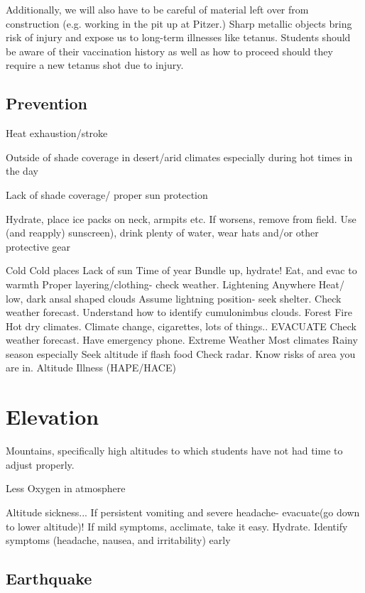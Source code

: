\documentclass[12pt]{../SOP2}
\begin{document}
\NP Additionally, we will also have to be careful of material left over from construction (e.g. working in the pit up at Pitzer.) Sharp metallic objects bring risk of injury and expose us to long-term illnesses like tetanus. Students should be aware of their vaccination history as well as how to proceed should they require a new tetanus shot due to injury.

\subsection{Prevention} 

\NP Heat exhaustion/stroke

\NP Outside of shade coverage in desert/arid climates especially during hot times in the day

\NP Lack of shade coverage/ proper sun protection

\NP Hydrate, place ice packs on neck, armpits etc. If worsens, remove from field.
Use (and reapply) sunscreen), drink plenty of water, wear hats and/or other protective gear

Cold
Cold places
Lack of sun
Time of year
Bundle up, hydrate! Eat, and evac to warmth
Proper layering/clothing- check weather.
Lightening
Anywhere
Heat/ low, dark ansal shaped clouds
Assume lightning position- seek shelter.
Check weather forecast. Understand how to identify cumulonimbus clouds.
Forest Fire
Hot dry climates.
Climate change, cigarettes, lots of things..
EVACUATE
Check weather forecast. Have emergency phone.
Extreme Weather
Most climates
Rainy season especially
Seek altitude if flash food
Check radar. Know risks of area you are in.
Altitude Illness (HAPE/HACE)

\section{Elevation}

\NP Mountains, specifically high altitudes to which students have not had time to adjust properly. 

\NP Less Oxygen in atmosphere

\NP Altitude sickness... If persistent vomiting and severe headache- evacuate(go down to lower altitude)! If mild symptoms, acclimate, take it easy. Hydrate.
Identify symptoms (headache, nausea, and irritability) early

\subsection{Earthquake}
\end{document}

